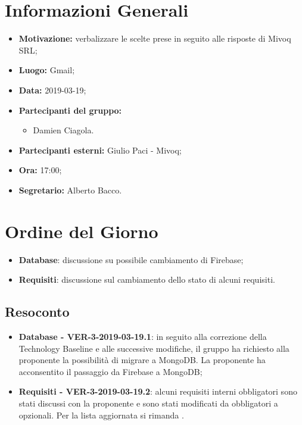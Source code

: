 \documentclass[a4paper, oneside, openany, dvipsnames, table]{article}
\begin{document}
\copertina{}


\newpage
\tableofcontents
\newpage
\section{Informazioni Generali}
\begin{itemize}
\item \textbf{Motivazione:} verbalizzare le scelte prese in seguito alle risposte di Mivoq SRL;
\item \textbf{Luogo:} Gmail;
\item \textbf{Data:} 2019-03-19;
\item \textbf{Partecipanti del gruppo:} \hfill
	\begin{itemize}
	\item Damien Ciagola.
	\end{itemize} 
\item \textbf{Partecipanti esterni:} Giulio Paci - Mivoq;
\item \textbf{Ora:} 17:00;
\item \textbf{Segretario:} Alberto Bacco.
\end{itemize}

\section{Ordine del Giorno}
\begin{itemize}
		\item \textbf{Database}: discussione su possibile cambiamento di Firebase;
	\item \textbf{Requisiti}: discussione sul cambiamento dello stato di alcuni requisiti.
\end{itemize}

\subsection{Resoconto}
\begin{itemize}
	\item \textbf{Database - VER-3-2019-03-19.1}: in seguito alla correzione della Technology Baseline e alle successive modifiche, il gruppo ha richiesto alla proponente la possibilità di migrare a MongoDB. La proponente ha acconsentito il passaggio da Firebase a MongoDB;
	\item \textbf{Requisiti - VER-3-2019-03-19.2}: alcuni requisiti interni obbligatori sono stati discussi con la proponente e sono stati modificati da obbligatori a opzionali. Per la lista aggiornata si rimanda \AdR{}. 
\end{itemize}
\end{document}
